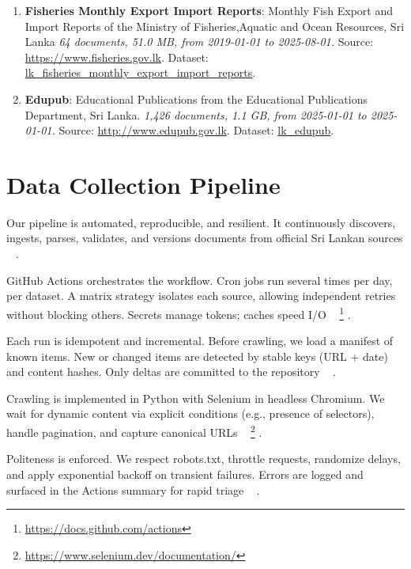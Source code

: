 \documentclass[10pt,a4paper]{article}%
\begin{document}
\begin{enumerate}
\item%
\textbf{Fisheries Monthly Export Import Reports}: Monthly Fish Export and Import Reports of the Ministry of Fisheries,Aquatic and Ocean Resources, Sri Lanka\textit{ 64 documents, 51.0 MB, from 2019{-}01{-}01 to 2025{-}08{-}01.} Source: \href{https://www.fisheries.gov.lk}{https://www.fisheries.gov.lk}. Dataset: \href{https://github.com/nuuuwan/lk\_fisheries/tree/data\_lk\_fisheries\_monthly\_export\_import\_reports/data/lk\_fisheries\_monthly\_export\_import\_reports}{lk\_fisheries\_monthly\_export\_import\_reports}.%
\item%
\textbf{Edupub}: Educational Publications from the Educational Publications Department, Sri Lanka.\textit{ 1,426 documents, 1.1 GB, from 2025{-}01{-}01 to 2025{-}01{-}01.} Source: \href{http://www.edupub.gov.lk}{http://www.edupub.gov.lk}. Dataset: \href{https://github.com/nuuuwan/lk\_edupub/tree/data/data/lk\_edupub}{lk\_edupub}.%
\end{enumerate}

%
\section{Data Collection Pipeline}%
\label{sec:DataCollectionPipeline}%
Our pipeline is automated, reproducible, and
 resilient. It continuously discovers, ingests,
 parses, validates, and versions documents from
 official Sri Lankan sources%
~%
\citep{MLOpsSurvey2022}%
.%

%
GitHub Actions orchestrates the workflow.
 Cron jobs run several times per day, per
 dataset. A matrix strategy isolates each source,
 allowing independent retries without blocking
 others. Secrets manage tokens; caches speed I/O%
~%
\footnote{\href{https://docs.github.com/actions}{https://docs.github.com/actions}}%
.%

%
Each run is idempotent and incremental.
 Before crawling, we load a manifest of known
 items. New or changed items are detected by
 stable keys (URL + date) and content hashes.
 Only deltas are committed to the repository%
~%
\citep{ReproducibleResearch2017}%
.%

%
Crawling is implemented in Python with
 Selenium in headless Chromium.
 We wait for dynamic content via explicit
 conditions (e.g., presence of selectors),
 handle pagination, and capture canonical URLs%
~%
\footnote{\href{https://www.selenium.dev/documentation/}{https://www.selenium.dev/documentation/}}%
.%

%
Politeness is enforced. We respect robots.txt,
 throttle requests, randomize delays, and apply
 exponential backoff on transient failures.
 Errors are logged and surfaced in the Actions
 summary for rapid triage%
~%
\citep{WebCrawlingBestPractices2021}%
.%
\end{document}
